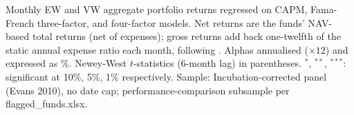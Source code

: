 \begin{table}[H]
\centering
{}
\setlength{\tabletempwidth}{\wd\tabletempbox}
\ifdim\tabletempwidth>\linewidth\setlength{\tabletempwidth}{\linewidth}\fi
\begin{minipage}{\tabletempwidth}
\captionsetup{width=\linewidth}
\caption{\label{tab:port_agg_alpha}Active vs.\ Passive Aggregate Portfolio Alpha (\%, Annualised)}
\ifdim\wd\tabletempbox>\linewidth
  \resizebox{\linewidth}{!}{\usebox{\tabletempbox}}
\else
  \usebox{\tabletempbox}
\fi
\par\medskip
\begin{singlespace}\footnotesize\noindent
Monthly EW and VW aggregate portfolio returns regressed on CAPM, Fama-French three-factor, and \textcite{Carhart1997} four-factor models. Net returns are the funds' NAV-based total returns (net of expenses); gross returns add back one-twelfth of the static annual expense ratio each month, following \textcite{FamaFrench2010}. Alphas annualised ($\times 12$) and expressed as \%. Newey-West $t$-statistics (6-month lag) in parentheses. $^{*}$, $^{**}$, $^{***}$: significant at 10\%, 5\%, 1\% respectively. Sample: Incubation-corrected panel (Evans 2010), no date cap; performance-comparison subsample per flagged\_funds.xlsx.
\end{singlespace}
\end{minipage}
\end{table}

